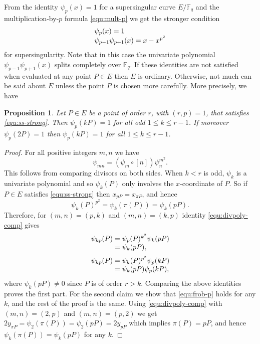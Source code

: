 \documentclass[12pt]{article}
\theoremstyle{plain}
\newtheorem{proposition}[theorem]{Proposition}
\theoremstyle{definition}
\def\F{\ensuremath{\mathbb{F}}}
\begin{document}
From the identity $\psi_p(x) = 1$ for a supersingular curve $E/\F_q$ and the multiplication-by-$p$ 
formula \eqref{equ:mult-p} we get the stronger condition
\begin{equation}
\label{equ:ss-strong}
	\arraycolsep=1.4pt
	\begin{array}{l}
		\psi_p(x) = 1 \\
		\psi_{p - 1}\psi_{p + 1}(x) = x - x^{p^2}
	\end{array}
\end{equation}
for supersingularity. Note that in this case the univariate polynomial $\psi_{p - 1}\psi_{p + 
1}(x)$ splits completely over $\F_q$. If these identities are not satisfied when evaluated at any 
point $P \in E$ then $E$ is ordinary. Otherwise, not much can be said about $E$ unless the point 
$P$ is chosen more carefully. More precisely, we have
\begin{proposition}
	Let $P \in E$ be a point of order $r$, with $(r, p) = 1$, that satisfies \eqref{equ:ss-strong}. 
	Then $\psi_p(kP) = 1$ for all odd $1 \le k \le r - 1$. If moreover $\psi_p(2P) = 1$ then 
	$\psi_p(kP) = 1$ for all $1 \le k \le r - 1$.
\end{proposition}
\begin{proof}
	For all positive integers $m, n$ we have
	\begin{equation}
	\label{equ:divpoly-comp}
		\psi_{mn} = (\psi_m \circ [n])\psi_n^{m^2}.
	\end{equation}
	This follows from comparing divisors on both sides. When $k < r$ is odd, $\psi_k$ is a 
	univariate polynomial and so $\psi_k(P)$ only involves the $x$-coordinate of $P$. So if $P \in 
	E$ satisfies \eqref{equ:ss-strong} then $x_{pP} = x_{\pi P}$, and hence 
	\begin{equation}
	\label{equ:frob-p}
		\psi_k(P)^{p^2} = \psi_k(\pi(P)) = \psi_k(pP).
	\end{equation}
	Therefore, for $(m, n) = (p, k)$ and $(m, n) = (k, p)$ identity \eqref{equ:divpoly-comp} gives
	\[
	\arraycolsep=1.4pt
	\begin{array}{rll}
		\psi_{kp}(P) & = & \psi_p(P)^{k^2} \psi_k(pP) \\
		& = & \psi_k(pP), \vspace*{2mm} \\		 
		\psi_{kp}(P) & = & \psi_k(P)^{p^2} \psi_p(kP) \\
		& = & \psi_k(pP) \psi_p(kP), \\
	\end{array}
	\]
	where $\psi_k(pP) \ne 0$ since $P$ is of order $r > k$. Comparing the above identities proves 
	the first part. For the second claim we show that \eqref{equ:frob-p} holds for any $k$, and the 
	rest of the proof is the same. Using \eqref{equ:divpoly-comp} with $(m, n) = (2, p)$ and $(m, 
	n) = (p, 2)$ we get $2y_{\pi P} = \psi_2(\pi(P)) = \psi_2(pP) = 2y_{pP}$ which implies $\pi(P) 
	= pP$, and hence $\psi_k(\pi(P)) = \psi_k(pP)$ for any $k$.
\end{proof}
\end{document}
